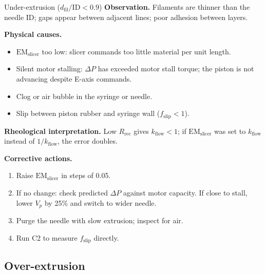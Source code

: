 \documentclass[11pt,a4paper]{article}
\begin{document}
\begin{failurebox}{Under-extrusion ($d_\mathrm{fil}/\mathrm{ID}<0.9$)}
\textbf{Observation.} Filaments are thinner than the needle ID;
gaps appear between adjacent lines; poor adhesion between layers.

\textbf{Physical causes.}
\begin{itemize}[leftmargin=1.4em,itemsep=2pt]
\item $\mathrm{EM}_\mathrm{slicer}$ too low: slicer commands too little
  material per unit length.
\item Silent motor stalling: $\Delta P$ has exceeded motor stall torque;
  the piston is not advancing despite E-axis commands.
\item Clog or air bubble in the syringe or needle.
\item Slip between piston rubber and syringe wall ($f_\mathrm{slip}<1$).
\end{itemize}

\textbf{Rheological interpretation.} Low $R_\mathrm{rec}$ gives
$k_\mathrm{flow}<1$; if $\mathrm{EM}_\mathrm{slicer}$ was set to
$k_\mathrm{flow}$ instead of $1/k_\mathrm{flow}$, the error doubles.

\textbf{Corrective actions.}
\begin{enumerate}[leftmargin=1.6em,itemsep=1pt]
\item Raise $\mathrm{EM}_\mathrm{slicer}$ in steps of 0.05.
\item If no change: check predicted $\Delta P$ against motor capacity.
  If close to stall, lower $V_p$ by 25\% and switch to wider needle.
\item Purge the needle with slow extrusion; inspect for air.
\item Run C2 to measure $f_\mathrm{slip}$ directly.
\end{enumerate}
\end{failurebox}

\subsection{Over-extrusion}
\end{document}
